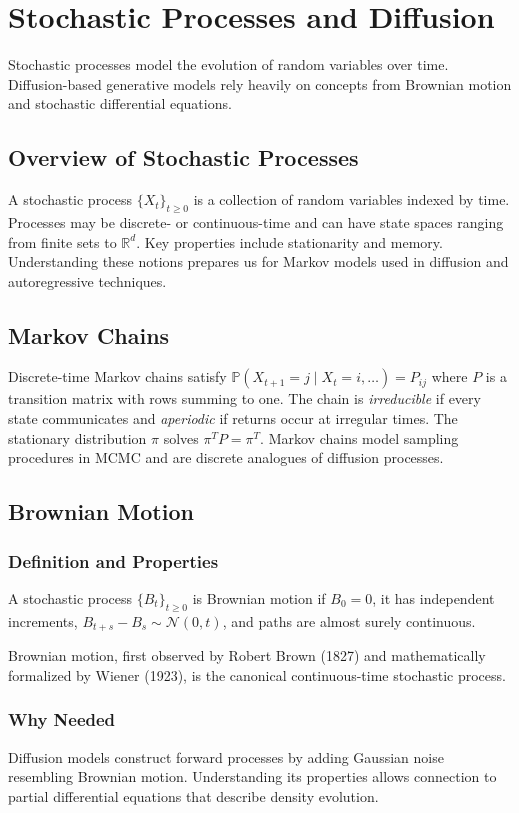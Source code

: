 \chapter{Stochastic Processes and Diffusion}\label{sec:sp}
Stochastic processes model the evolution of random variables over time. Diffusion-based generative models rely heavily on concepts from Brownian motion and stochastic differential equations.

\section{Overview of Stochastic Processes}
A stochastic process $\{X_t\}_{t\ge0}$ is a collection of random variables indexed by time. Processes may be discrete- or continuous-time and can have state spaces ranging from finite sets to $\mathbb{R}^d$. Key properties include stationarity and memory. Understanding these notions prepares us for Markov models used in diffusion and autoregressive techniques.

\section{Markov Chains}
Discrete-time Markov chains satisfy $\mathbb{P}(X_{t+1}=j\mid X_t=i,\ldots)=P_{ij}$ where $P$ is a transition matrix with rows summing to one. The chain is \emph{irreducible} if every state communicates and \emph{aperiodic} if returns occur at irregular times. The stationary distribution $\pi$ solves $\pi^T P=\pi^T$. Markov chains model sampling procedures in MCMC and are discrete analogues of diffusion processes.

\section{Brownian Motion}
\subsection{Definition and Properties}
\begin{definition}
A stochastic process $\{B_t\}_{t\ge0}$ is Brownian motion if $B_0=0$, it has independent increments, $B_{t+s}-B_s\sim\mathcal{N}(0,t)$, and paths are almost surely continuous.
\end{definition}
Brownian motion, first observed by Robert Brown (1827) and mathematically formalized by Wiener (1923), is the canonical continuous-time stochastic process.

\subsection{Why Needed}
Diffusion models construct forward processes by adding Gaussian noise resembling Brownian motion. Understanding its properties allows connection to partial differential equations that describe density evolution.

